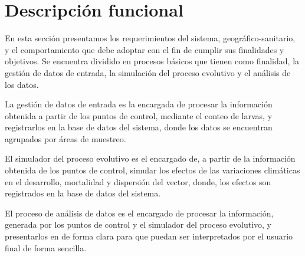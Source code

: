 
\section{Descripción funcional}
En esta sección presentamos los requerimientos del sistema, geográfico-sanitario, y el
comportamiento que debe adoptar con el fin de cumplir sus finalidades y objetivos. Se encuentra
dividido en procesos básicos que tienen como finalidad, la gestión de datos de entrada, la
simulación del proceso evolutivo y el análisis de los datos.

La gestión de datos de entrada es la encargada de procesar la información obtenida a partir de los
puntos de control, mediante el conteo de larvas, y registrarlos en la base de datos del sistema,
donde los datos se encuentran agrupados por áreas de muestreo.

El simulador del proceso evolutivo es el encargado de, a partir de la información obtenida de los
puntos de control, simular los efectos de las variaciones climáticas en el desarrollo, mortalidad
y dispersión del vector, donde, los efectos son registrados en la base de datos del sistema.

El proceso de análisis de datos es el encargado de procesar la información, generada por los
puntos de control y el simulador del proceso evolutivo, y presentarlos en de forma clara para que
puedan ser interpretados por el usuario final de forma sencilla.




